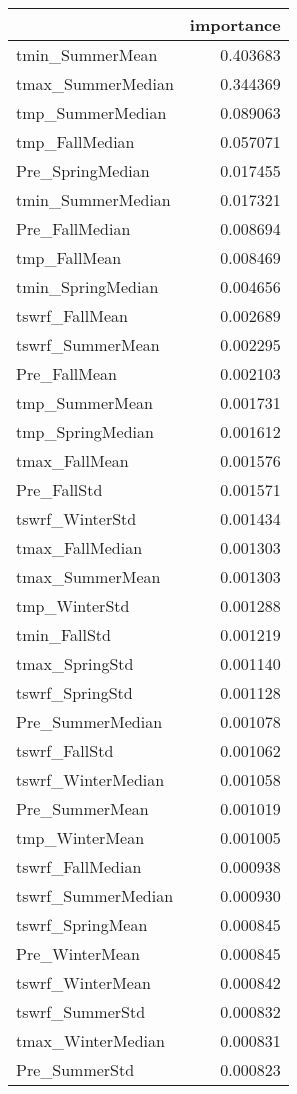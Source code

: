 \begin{tabular}{lr}
\toprule
 & importance \\
\midrule
tmin_SummerMean & 0.403683 \\
tmax_SummerMedian & 0.344369 \\
tmp_SummerMedian & 0.089063 \\
tmp_FallMedian & 0.057071 \\
Pre_SpringMedian & 0.017455 \\
tmin_SummerMedian & 0.017321 \\
Pre_FallMedian & 0.008694 \\
tmp_FallMean & 0.008469 \\
tmin_SpringMedian & 0.004656 \\
tswrf_FallMean & 0.002689 \\
tswrf_SummerMean & 0.002295 \\
Pre_FallMean & 0.002103 \\
tmp_SummerMean & 0.001731 \\
tmp_SpringMedian & 0.001612 \\
tmax_FallMean & 0.001576 \\
Pre_FallStd & 0.001571 \\
tswrf_WinterStd & 0.001434 \\
tmax_FallMedian & 0.001303 \\
tmax_SummerMean & 0.001303 \\
tmp_WinterStd & 0.001288 \\
tmin_FallStd & 0.001219 \\
tmax_SpringStd & 0.001140 \\
tswrf_SpringStd & 0.001128 \\
Pre_SummerMedian & 0.001078 \\
tswrf_FallStd & 0.001062 \\
tswrf_WinterMedian & 0.001058 \\
Pre_SummerMean & 0.001019 \\
tmp_WinterMean & 0.001005 \\
tswrf_FallMedian & 0.000938 \\
tswrf_SummerMedian & 0.000930 \\
tswrf_SpringMean & 0.000845 \\
Pre_WinterMean & 0.000845 \\
tswrf_WinterMean & 0.000842 \\
tswrf_SummerStd & 0.000832 \\
tmax_WinterMedian & 0.000831 \\
Pre_SummerStd & 0.000823 \\

\end{tabular}
